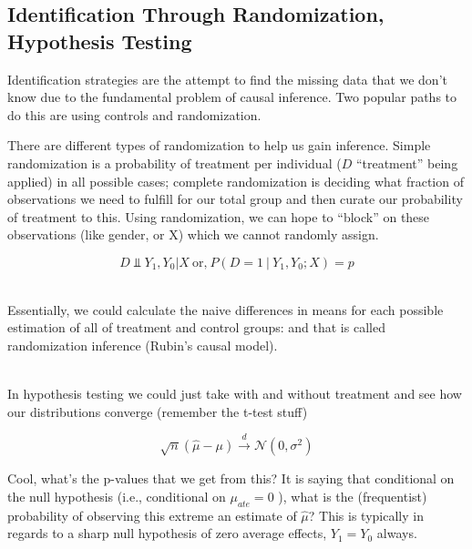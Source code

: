 \documentclass[12pt]{article}\usepackage[]{graphicx}\usepackage[]{color}
\begin{document}
\begin{flushleft}
\subsection{Identification Through Randomization, Hypothesis Testing}

Identification strategies are the attempt to find the missing data that we don't know due to the fundamental problem of causal inference. Two popular paths to do this are using controls and randomization.

There are different types of randomization to help us gain inference. Simple randomization is a probability of treatment per individual ($D$ ``treatment'' being applied) in all possible cases; complete randomization is deciding what fraction of observations we need to fulfill for our total group and then curate our probability of treatment to this. Using randomization, we can hope to ``block'' on these observations (like gender, or X) which we cannot randomly assign.

\begin{equation}
D \Vbar Y_1, Y_0 | X ~ \text{or,} ~ P(D=1 ~ | ~ Y_1, Y_0; X) = p
\end{equation}

\hfill \\

Essentially, we could calculate the naive differences in means for each possible estimation of all of treatment and control groups: and that is called randomization inference (Rubin's causal model).


\hfill \\

In hypothesis testing we could just take with and without treatment and see how our distributions converge (remember the t-test stuff)

\begin{equation}
\sqrt{n}(\hat{\mu} - \mu) \xrightarrow[]{d} \mathcal{N}(0, \sigma^2)
\end{equation}

Cool, what's the p-values that we get from this? It is saying that conditional on the null hypothesis (i.e., conditional on $\mu_{ate} = 0$ ), what is the (frequentist) probability of observing this extreme an estimate of $\hat{\mu}$? This is typically in regards to a sharp null hypothesis of zero average effects, $Y_1 = Y_0$ always. 





\end{flushleft}
\end{document}
